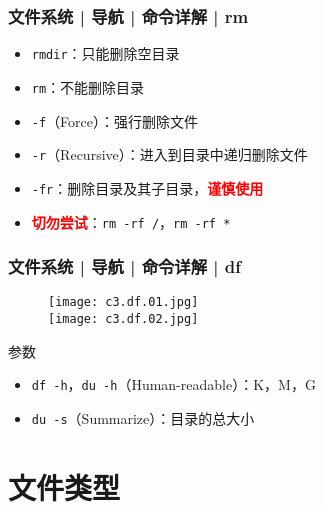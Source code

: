 \begin{frame}[fragile]
  \frametitle{文件系统 | 导航 | 命令详解 | \alert{rm}}
  \begin{itemize}[<+->]
    \item \verb|rmdir|：只能删除空目录
    \item \verb|rm|：不能删除目录
    \item \verb|-f|（Force）：强行删除文件
    \item \verb|-r|（Recursive）：进入到目录中递归删除文件
    \item \verb|-fr|：删除目录及其子目录，\textcolor{red}{\textbf{谨慎使用}}
    \item \textcolor{red}{\textbf{切勿尝试}}：\verb|rm -rf /|，\verb|rm -rf *|
  \end{itemize}
\end{frame}

\begin{frame}[fragile]
  \frametitle{文件系统 | 导航 | 命令详解 | \alert{df}}
  \begin{figure}
    \centering
    \texttt{[image: c3.df.01.jpg]}\\
    \texttt{[image: c3.df.02.jpg]}
  \end{figure}
  \vspace{-0.5cm}
  \begin{block}{参数}
    \begin{itemize}
      \item \verb|df -h|，\verb|du -h|（Human-readable）：K，M，G
      \item \verb|du -s|（Summarize）：目录的总大小
    \end{itemize}
  \end{block}
\end{frame}

\section{文件类型}
